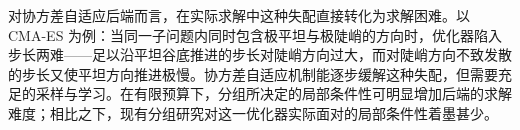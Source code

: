 对协方差自适应后端而言，在实际求解中这种失配直接转化为求解困难。以 CMA-ES 为例：当同一子问题内同时包含极平坦与极陡峭的方向时，优化器陷入步长两难——足以沿平坦谷底推进的步长对陡峭方向过大，而对陡峭方向不致发散的步长又使平坦方向推进极慢。协方差自适应机制能逐步缓解这种失配，但需要充足的采样与学习。在有限预算下，分组所决定的局部条件性可明显增加后端的求解难度；相比之下，现有分组研究对这一优化器实际面对的局部条件性着墨甚少。